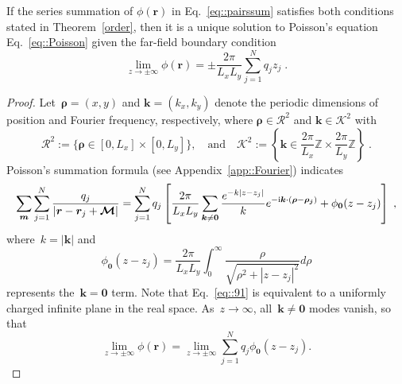 \begin{prop}\label{prop::boundary}
	If the series summation of $\phi(\bm{r})$ in Eq.~\eqref{eq::pairssum} satisfies both conditions stated in Theorem~\ref{order}, then it is a unique solution to Poisson's equation Eq.~\eqref{eq::Poisson} given the far-field boundary condition
	\begin{equation}\label{eq::boundary1}
		\lim_{z \to \pm \infty} \phi(\bm{r}) = \pm \frac{2\pi}{L_x L_y} \sum_{j=1}^{N} q_{j} z_{j}\;.
	\end{equation}
\end{prop}

\begin{proof}
	Let~$\bm{\rho}=(x,y)$ and $\bm{k}=(k_x, k_y)$ denote the periodic dimensions of position and Fourier frequency, respectively, where $\bm{\rho}\in\mathcal{R}^2$ and $\bm{k}\in\mathcal{K}^2$ with
	\begin{equation}
		\mathcal{R}^2:=\{\bm{\rho}\in[0,L_x]\times [0,L_y]\},\quad \text{and}\quad \mathcal{K}^2:=\left\{\bm{k}\in\frac{2\pi}{L_x}\mathbb{Z}\times \frac{2\pi}{L_y}\mathbb{Z}\right\}\;.
	\end{equation} 
	Poisson's summation formula (see Appendix~\ref{app::Fourier}) indicates 
	\begin{equation}\label{eq::poisson_sum}
		\sum_{\boldsymbol{m}} \sum_{j = 1}^N \frac{q_{j}}{|\bm{r}-\bm{r}_{j} + \bm{\mathcal{M}}|} =  \sum_{j = 1}^N q_j \left[ \frac{2 \pi}{L_x L_y} \sum_{\bm{k} \neq \bm{0}} \frac{e^{-k \lvert z - z_j\rvert}}{k} e^{- \mathrm{i} \bm{k} \cdot (\bm{\rho} - \bm{\rho_j})} + \phi_{\bm{0}}(z-z_j)\right]\;,
	\end{equation}
	where~$k=|\bm{k}|$ and 
	\begin{equation}\label{eq::91}
		\phi_{\bm{0}}(z-z_j) = \frac{2\pi}{L_x L_y} \int_{0}^\infty \frac{ \rho}{\sqrt{\rho^2 + |z - z_j|^2}} d\rho
	\end{equation}
	represents the~$\bm{k}=\bm{0}$ term. Note that Eq.~\eqref{eq::91} is equivalent to a uniformly charged infinite plane in the real space. 
	As~$z \to \infty$, all~$\bm{k} \neq \bm{0}$ modes vanish, so that 
	\begin{equation}
		\lim_{z \to \pm \infty} \phi(\bm{r})=\lim_{z \to \pm \infty}\sum_{j=1}^{N}q_j\phi_{\bm{0}}(z-z_j).
	\end{equation}

\end{proof}
